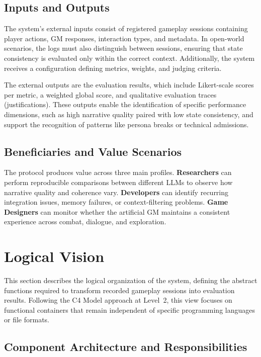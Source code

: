 \documentclass[12pt]{article}
\begin{document}
\subsection{Inputs and Outputs}

The system's external inputs consist of registered gameplay sessions containing player actions, GM responses, interaction types, and metadata. In open-world scenarios, the logs must also distinguish between sessions, ensuring that state consistency is evaluated only within the correct context. Additionally, the system receives a configuration defining metrics, weights, and judging criteria.

The external outputs are the evaluation results, which include Likert-scale scores per metric, a weighted global score, and qualitative evaluation traces (justifications). These outputs enable the identification of specific performance dimensions, such as high narrative quality paired with low state consistency, and support the recognition of patterns like persona breaks or technical admissions.

\subsection{Beneficiaries and Value Scenarios}

The protocol produces value across three main profiles. \textbf{Researchers} can perform reproducible comparisons between different LLMs to observe how narrative quality and coherence vary. \textbf{Developers} can identify recurring integration issues, memory failures, or context-filtering problems. \textbf{Game Designers} can monitor whether the artificial GM maintains a consistent experience across combat, dialogue, and exploration.

\section{Logical Vision}
\label{sec:logical}

This section describes the logical organization of the system, defining the abstract functions required to transform recorded gameplay sessions into evaluation results. Following the C4 Model approach \cite{brown:2024} at Level~2, this view focuses on functional containers that remain independent of specific programming languages or file formats.

\subsection{Component Architecture and Responsibilities}
\end{document}
